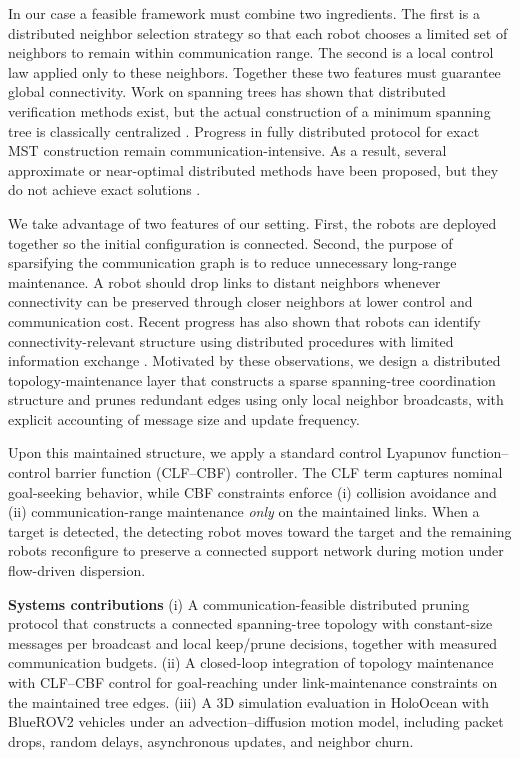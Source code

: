 \documentclass[conference]{IEEEconf}
\theoremstyle{plain}
\begin{document}
In our case a feasible framework must combine two ingredients. The first is a distributed neighbor selection strategy so that each robot chooses a limited set of neighbors to remain within communication range. The second is a local control law applied only to these neighbors. Together these two features must guarantee global connectivity. Work on spanning trees has shown that distributed verification methods exist, but the actual construction of a minimum spanning tree is classically centralized \cite{boruvka1926, kruskal1956, prim1957}. Progress in fully distributed protocol for exact MST construction \cite{gallager1983, awerbuch1987} remain communication-intensive. As a result, several approximate or near-optimal distributed methods have been proposed, but they do not achieve exact solutions \cite{khan2008}.

We take advantage of two features of our setting. First, the robots are deployed together so the initial configuration is connected. Second, the purpose of sparsifying the communication graph is to reduce unnecessary long-range maintenance. A robot should drop links to distant neighbors whenever connectivity can be preserved through closer neighbors at lower control and communication cost. Recent progress has also shown that robots can identify connectivity-relevant structure using distributed procedures with limited information exchange \cite{venkateswaran2024}. Motivated by these observations, we design a distributed topology-maintenance layer that constructs a sparse spanning-tree coordination structure and prunes redundant edges using only local neighbor broadcasts, with explicit accounting of message size and update frequency.

Upon this maintained structure, we apply a standard control Lyapunov function--control barrier function (CLF--CBF) controller. The CLF term captures nominal goal-seeking behavior, while CBF constraints enforce (i) collision avoidance and (ii) communication-range maintenance \emph{only} on the maintained links. When a target is detected, the detecting robot moves toward the target and the remaining robots reconfigure to preserve a connected support network during motion under flow-driven dispersion.

\textbf{Systems contributions} (i) A communication-feasible distributed pruning protocol that constructs a connected spanning-tree topology with constant-size messages per broadcast and local keep/prune decisions, together with measured communication budgets. (ii) A closed-loop integration of topology maintenance with CLF--CBF control for goal-reaching under link-maintenance constraints on the maintained tree edges. (iii) A 3D simulation evaluation in HoloOcean with BlueROV2 vehicles under an advection--diffusion motion model, including packet drops, random delays, asynchronous updates, and neighbor churn.
\end{document}
